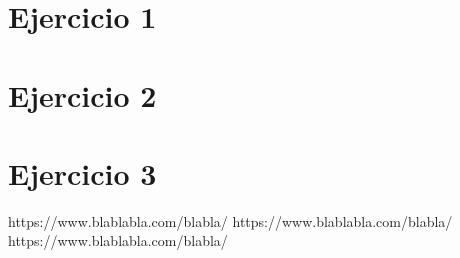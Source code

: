 \documentclass[a4paper]{article}
\begin{document}
\begin{abstract}
\begin{itemize}
        Tambi\'en se incluyen aquellas hip\'otesis que fueron confirmadas, o rechazadas, por los resultados que arrojaron los programas, y su consecuencia en la discusi\'on que conllev\'o en el grupo. Hubo pasos en falso como tambien aciertos. No siempre la implementaci\'on de una poda o la memoizacion con cierta estructura tiene por qu\'e mejorar dr\'asticamente el rendimiento de un algoritmo. 
               
        Luego de conocer cómo se comportan las distintas variantes de los algoritmos implementados en cada ejercicio,  se pone el foco en los tiempos de computos que dichas variantes arrojan y las comparamos entre s\'i para convalidar ciertas suposiciones. 
        
        \item \textbf{Conclusiones}: Se concluye que...
        
        Los valores ideales para los métodos fueron los siguientes: \newline
        \textit{Ejercicio 1}: \textbf{blablabla.} \newline
        \textit{Ejercicio 2}: \textbf{blablabla.} \newline
        \textit{Ejercicio 3}: \textbf{blablabla.}  \newline
    \end{itemize}
    
    \textbf{Palabras clave}: \textit{Fuerza Bruta}, \textit{Backtracking}, \textit{Greedy}, \textit{Programaci\'on Din\'amica}, \textit{Complejidad Temporal}, \textit{Complejidad Espacial}.
\end{abstract}



%

\tableofcontents
\thispagestyle{empty}

\newpage

\section{Ejercicio 1}\label{sec:ej1}


\newpage

\section{Ejercicio 2}\label{sec:ej2}


\newpage

\section{Ejercicio 3}\label{sec:ej3}



\newpage


\begin{thebibliography}{1}

 https://www.blablabla.com/blabla/
 https://www.blablabla.com/blabla/
 https://www.blablabla.com/blabla/

\end{thebibliography}
\end{document}
